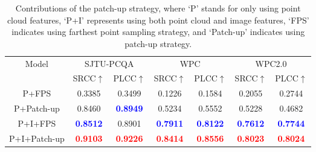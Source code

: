 \documentclass{article}
\begin{document}
\begin{table}[tb]\small

\renewcommand\tabcolsep{2pt}
    \centering
    \begin{tabular}{c|cc|cc|cc}
    \toprule
    \multirow{2}{*}{Model}  & \multicolumn{2}{c|}{SJTU-PCQA} & \multicolumn{2}{c|}{WPC} & \multicolumn{2}{c}{WPC2.0}\\ \cline{2-7}
            & SRCC$\uparrow$    & PLCC$\uparrow$   & SRCC$\uparrow$   & PLCC$\uparrow$ & SRCC$\uparrow$   & PLCC$\uparrow$\\ \hline
        P+FPS         &0.3385 &0.3499 & 0.1226 & 0.1584 & 0.2055 & 0.2744\\
        P+Patch-up    &0.8460 &\bf\textcolor{blue}{0.8949} & 0.5234 & 0.5552 & 0.5228 & 0.4682\\ 
        P+I+FPS       &\bf\textcolor{blue}{0.8512} &{0.8901} & \bf\textcolor{blue}{0.7911} & \bf\textcolor{blue}{0.8122} & \bf\textcolor{blue}{0.7612} & \bf\textcolor{blue}{0.7744}\\
        P+I+Patch-up  & \bf\textcolor{red}{0.9103}   & \bf\textcolor{red}{0.9226}    &\bf\textcolor{red}{0.8414}    & \bf\textcolor{red}{0.8556}     &\bf\textcolor{red}{0.8023}    & \bf\textcolor{red}{0.8024} \\     
    \bottomrule
    \end{tabular}
    \caption{Contributions of the patch-up strategy, where `P' stands for only using point cloud features, `P+I' represents using both point cloud and image features, `FPS' indicates using farthest point sampling strategy, and `Patch-up' indicates using patch-up strategy. }
    \label{tab:patch}
\end{table}
\end{document}
